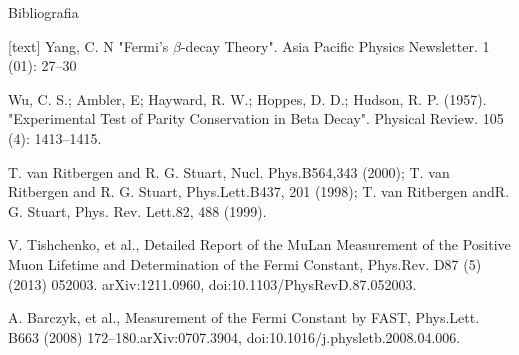 \documentclass[xcolor={dvipsnames}]{beamer}
\begin{document}
\begin{frame}{Bibliografia}

    \begin{thebibliography}{9}
        [text]
        \tiny
         Yang, C. N  "Fermi's $\beta$-decay Theory". Asia Pacific Physics Newsletter. 1 (01): 27–30

           Wu, C. S.; Ambler, E; Hayward, R. W.; Hoppes, D. D.; Hudson, R. P. (1957). "Experimental Test of Parity Conservation in Beta Decay". Physical Review. 105 (4): 1413–1415.

          T. van Ritbergen and R. G. Stuart, Nucl. Phys.B564,343 (2000); T. van Ritbergen and R. G. Stuart, Phys.Lett.B437,  201  (1998);   T. van  Ritbergen  andR. G. Stuart, Phys. Rev. Lett.82, 488 (1999).

         V.  Tishchenko,  et  al.,  Detailed  Report  of  the MuLan  Measurement  of the  Positive  Muon  Lifetime  and  Determination  of  the  Fermi  Constant, Phys.Rev.  D87  (5)  (2013) 052003. arXiv:1211.0960, doi:10.1103/PhysRevD.87.052003.

          A.  Barczyk,   et  al.,   Measurement  of  the  Fermi  Constant  by  FAST, Phys.Lett.  B663  (2008)  172–180.arXiv:0707.3904, doi:10.1016/j.physletb.2008.04.006.

    \end{thebibliography}

\end{frame}
\end{document}
